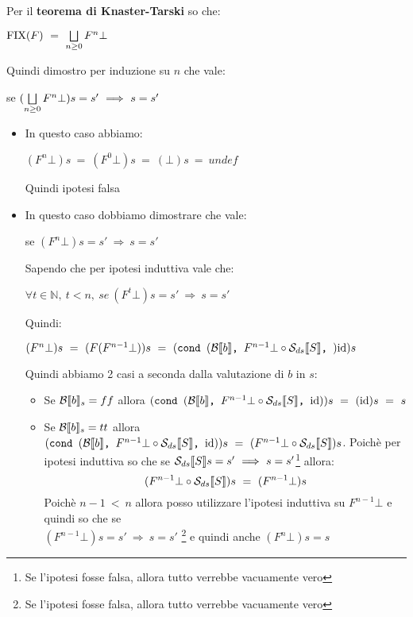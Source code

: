 {    Per il \textbf{teorema di Knaster-Tarski} so che:
    \begin{center}
    $\textrm{\normalfont{FIX}}(F)~=~\bigsqcup\limits_{n\geq{}0}F^{n}\bot$
    \end{center}
    Quindi dimostro per induzione su $n$ che vale:
    \begin{center}
    se $(\bigsqcup\limits_{n\geq{}0}F^{n}\bot)s=s'~\Longrightarrow~s=s'$
    \end{center}

    \begin{itemize}
    \item {} In questo caso abbiamo:
    \begin{center}
    $(F^{n}\bot)s~=~(F^{0}\bot)s~=~(\bot)s~=~undef$
    \end{center}
    Quindi ipotesi falsa
    \item {} In questo caso dobbiamo dimostrare che vale:
    \begin{center}
    se $(F^{n}\bot)s=s'~\Longrightarrow~s=s'$
    \end{center}
    Sapendo che per ipotesi induttiva vale che:
    \begin{center}
    $\forall t\in\mathbb{N},~t<n,~se~(F^{t}\bot)s=s'~\Longrightarrow~s=s'$
    \end{center}
    Quindi:
    \begin{center}
    $(F^{n}\bot)s~=~(F(F^{n-1}\bot))s~=~(\cond{b}{F^{n-1}\bot \circ \Sds}
    {\idDS})s$
    \end{center}
    Quindi abbiamo 2 casi a seconda dalla valutazione di $b$ in $s$:
    \begin{itemize}
    \item Se $\mathcal{B}{}\llbracket b \rrbracket_s=ff$ allora $(\mbox{\normalfont{\texttt{cond }}} (\mathcal{B}{}\llbracket b \rrbracket \textrm{\normalfont{\texttt{, }}} F^{n-1}\bot \circ \mathcal{S}_{ds}\llbracket S \rrbracket \textrm{\normalfont{\texttt{, }}} \textrm{\normalfont{id}}))s~=~(\textrm{\normalfont{id}})s~=~s$

    \item Se $\mathcal{B}{}\llbracket b \rrbracket_s=tt$ allora $(\mbox{\normalfont{\texttt{cond }}} (\mathcal{B}{}\llbracket b \rrbracket \textrm{\normalfont{\texttt{, }}} F^{n-1}\bot \circ \mathcal{S}_{ds}\llbracket S \rrbracket \textrm{\normalfont{\texttt{, }}} \textrm{\normalfont{id}}))s~=~(F^{n-1}\bot \circ \mathcal{S}_{ds}\llbracket S \rrbracket)s$. Poichè per ipotesi induttiva so che
    se $\mathcal{S}_{ds}\llbracket S \rrbracket{}s=s'~\Longrightarrow~s=s'$\footnote{Se l'ipotesi fosse falsa,
    allora tutto verrebbe vacuamente vero} allora:
    \[
        (F^{n-1}\bot \circ \mathcal{S}_{ds}\llbracket S \rrbracket{})s~=~(F^{n-1}\bot)s
    \]
    Poichè $n-1~<~n$ allora posso utilizzare l'ipotesi induttiva su 
    $F^{n-1}\bot$ e quindi so che se \\$(F^{n-1}\bot)s=s'~\Longrightarrow~s=s'$
    \footnote{Se l'ipotesi fosse falsa, allora tutto verrebbe vacuamente vero}
    e quindi anche $(F^{n}\bot)s=s$
    \end{itemize}
    \end{itemize}
}
\newpage